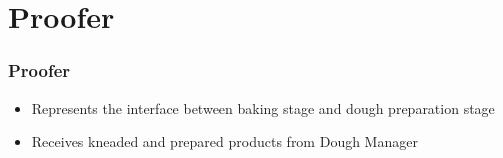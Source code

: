 \documentclass[hyperref={pdfpagelabels=false}]{beamer}
\begin{document}
    \section{Proofer}
    \begin{frame}
        \frametitle{Proofer}
        \begin{itemize}
            \item Represents the interface between baking stage and dough preparation stage
            \item Receives kneaded and prepared products from Dough Manager
        \end{itemize}
    \end{frame}
\end{document}
